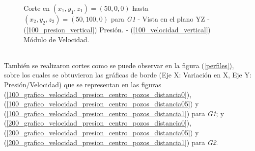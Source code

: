 \documentclass[10pt,a4paper,final]{article}
\begin{document}
%
%
\begin{figure}[tbhp]
   \centering
   \hspace{0.1\linewidth}
    \caption{Corte en $(x_1,y_1,z_1)=(50,0,0)$ hasta $(x_2,y_2,z_2)=(50,100,0)$ para \emph{G1} - Vista en el plano YZ - (\ref{100_presion_vertical}) Presión. - (\ref{100_velocidad_vertical}) Módulo de Velocidad.}
   \label{100_velocidad_presion_vertical}                %
\end{figure}
\\
También se realizaron cortes como se puede observar en la figura (\ref{perfiles}), sobre los cuales se obtuvieron las gráficas de borde (Eje X: Variación en X, Eje Y: Presión/Velocidad) que se representan en las figuras (\ref{100_grafico_velocidad_presion_centro_pozos_distancia0}), (\ref{100_grafico_velocidad_presion_centro_pozos_distancia05}) y (\ref{100_grafico_velocidad_presion_centro_pozos_distancia1}) para \emph{G1}; y (\ref{200_grafico_velocidad_presion_centro_pozos_distancia0}),(\ref{200_grafico_velocidad_presion_centro_pozos_distancia05}) y (\ref{200_grafico_velocidad_presion_centro_pozos_distancia1}) para \emph{G2}.
\end{document}
